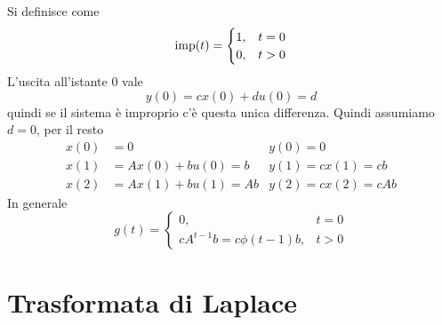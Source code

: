 Si definisce come
\begin{equation*}
	\operatorname{imp}(t) =\begin{cases}
	1, & t=0\\
	0, & t >0
	\end{cases}
\end{equation*}
L'uscita all'istante $0$ vale
\begin{equation*}
	y(0) =cx(0) +du(0) =d
\end{equation*}
quindi se il sistema è improprio c'è questa unica differenza. Quindi assumiamo $d=0$, per il resto
\begin{equation*}
	\begin{aligned}
		x(0) & =0                & y(0) =0          \\
		x(1) & =Ax(0) +bu(0) =b  & y(1) =cx(1) =cb  \\
		x(2) & =Ax(1) +bu(1) =Ab & y(2) =cx(2) =cAb 
	\end{aligned}
\end{equation*}
In generale
\begin{equation*}
	\boxed{g(t) =\begin{cases}
		0, & t=0\\
		cA^{t-1} b=c\phi (t-1) b, & t >0
		\end{cases}
	}
\end{equation*}

\section{Trasformata di Laplace}

